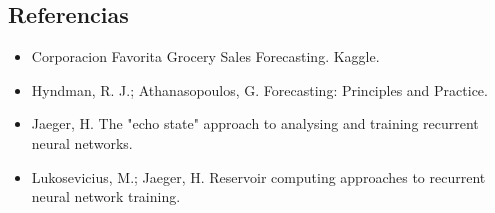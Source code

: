 \documentclass[12pt]{article}
\providecommand{\tightlist}{%
  \setlength{\itemsep}{0pt}\setlength{\parskip}{0pt}}
\begin{document}
\subsection{Referencias}\label{referencias}

\begin{itemize}
\tightlist
\item
  Corporacion Favorita Grocery Sales Forecasting. Kaggle.
\item
  Hyndman, R. J.; Athanasopoulos, G. Forecasting: Principles and Practice.
\item
  Jaeger, H. The "echo state" approach to analysing and training recurrent neural networks.
\item
  Lukosevicius, M.; Jaeger, H. Reservoir computing approaches to recurrent neural network training.
\end{itemize}
\end{document}
